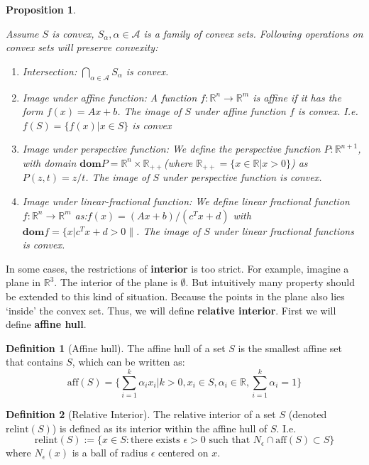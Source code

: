 \documentclass[
]{book}
\newtheorem{proposition}{Proposition}[chapter]
\theoremstyle{definition}
\newtheorem{definition}{Definition}[chapter]
\theoremstyle{definition}
\theoremstyle{definition}
\theoremstyle{definition}
\theoremstyle{remark}
\begin{document}
\begin{proposition}
\protect\hypertarget{prp:operationpreserveconvexity}{}\label{prp:operationpreserveconvexity}

Assume \(S\) is convex, \(S_\alpha,\alpha\in\mathcal{A}\) is a family of convex sets. Following operations on convex sets will preserve convexity:

\begin{enumerate}
\def\labelenumi{\arabic{enumi}.}
\item
  Intersection: \(\bigcap_{\alpha\in\mathcal{A}}S_\alpha\) is convex.
\item
  Image under affine function: A function \(f:\mathbb{R}^n\to\mathbb{R}^m\) is affine if it has the form \(f(x) = Ax+b\). The image of \(S\) under affine function \(f\) is convex. I.e. \(f(S) = \{f(x)|x\in S\}\) is convex
\item
  Image under perspective function: We define the perspective function \(P:\mathbb{R}^{n+1}\), with domain \(\textbf{dom}P = \mathbb{R}^n\times \mathbb{R}_{++}\)(where \(\mathbb{R}_{++}=\{x\in \mathbb{R}|x>0\}\)) as \(P(z,t) = z/t\). The image of \(S\) under perspective function is convex.
\item
  Image under linear-fractional function: We define linear fractional function \(f:\mathbb{R}^n\to\mathbb{R}^m\) as:\(f(x) = (Ax+b)/(c^Tx+d)\) with \(\textbf{dom}f = \{x|c^Tx+d>0\|\). The image of \(S\) under linear fractional functions is convex.
\end{enumerate}

\end{proposition}

In some cases, the restrictions of \textbf{interior} is too strict. For example, imagine a plane in \(\mathbb{R}^3\). The interior of the plane is \(\emptyset\). But intuitively many property should be extended to this kind of situation. Because the points in the plane also lies `inside' the convex set. Thus, we will define \textbf{relative interior}. First we will define \textbf{affine hull}.

\begin{definition}[Affine hull]
\protect\hypertarget{def:affinehull}{}\label{def:affinehull}The affine hull of a set \(S\) is the smallest affine set that contains \(S\), which can be written as:
\[\text{aff}(S) = \{\sum_{i=1}^k\alpha_ix_i|k>0,x_i\in S,\alpha_i\in\mathbb{R},\sum_{i=1}^k\alpha_i=1\}\]
\end{definition}

\begin{definition}[Relative Interior]
\protect\hypertarget{def:relint}{}\label{def:relint}The relative interior of a set \(S\) (denoted \(\text{relint}(S)\)) is defined as its interior within the affine hull of \(S\). I.e.
\[\text{relint}(S):=\{x\in S: \text{there exists } \epsilon>0 \text{ such that }N_\epsilon \cap \text{aff}(S)\subset S\}\]
where \(N_\epsilon(x)\) is a ball of radius \(\epsilon\) centered on \(x\).
\end{definition}
\end{document}
